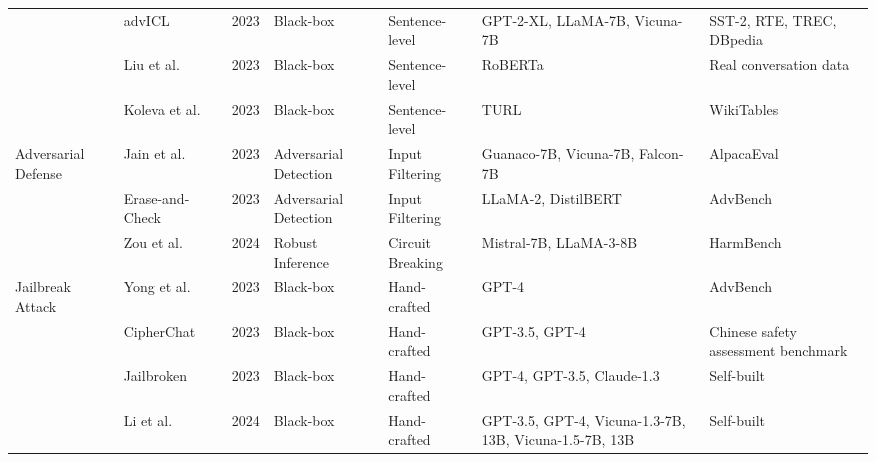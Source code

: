 \begin{table*}[htp]
{\begin{tabular}{p{}p{}p{}p{}p{}p{}p{}}
& \cellcolor{white}advICL~\cite{wang2023adversarial} & \cellcolor{white}2023 & \cellcolor{white}Black-box & \cellcolor{white}Sentence-level & \cellcolor{white}GPT-2-XL, LLaMA-7B, Vicuna-7B & \cellcolor{white}SST-2, RTE, TREC, DBpedia \\
& \cellcolor{gray!15!}Liu et al.~\cite{liu2023adversarial} & \cellcolor{gray!15!}2023 & \cellcolor{gray!15!}Black-box & \cellcolor{gray!15!}Sentence-level & \cellcolor{gray!15!}RoBERTa &  \cellcolor{gray!15!}Real conversation data \\
& \cellcolor{white}Koleva et al.~\cite{koleva2023adversarial} & \cellcolor{white}2023 & \cellcolor{white}Black-box & \cellcolor{white}Sentence-level & \cellcolor{white}TURL & \cellcolor{white}WikiTables \\
\hline
\multirow{3}{0.1\textwidth}{Adversarial Defense} & \cellcolor{gray!15!}Jain et al.\cite{jain2023baseline} & \cellcolor{gray!15!}2023 & \cellcolor{gray!15!}Adversarial Detection & \cellcolor{gray!15!}Input Filtering & \cellcolor{gray!15!}Guanaco-7B, Vicuna-7B, Falcon-7B & \cellcolor{gray!15!}AlpacaEval \\
& \cellcolor{white}Erase-and-Check~\cite{kumar2023certifying} & \cellcolor{white}2023 & \cellcolor{white}Adversarial Detection & \cellcolor{white}Input Filtering & \cellcolor{white}LLaMA-2, DistilBERT & \cellcolor{white}AdvBench \\
& \cellcolor{gray!15!}Zou et al.~\cite{zou2024improving} & \cellcolor{gray!15!}2024 & \cellcolor{gray!15!}Robust Inference & \cellcolor{gray!15!}Circuit Breaking & \cellcolor{gray!15!}Mistral-7B, LLaMA-3-8B & \cellcolor{gray!15!}HarmBench \\
\hline
\multirow{25}{0.1\textwidth}{Jailbreak Attack} & \cellcolor{white}Yong et al.~\cite{yong2023low} & \cellcolor{white}2023 & \cellcolor{white}Black-box & \cellcolor{white}Hand-crafted & \cellcolor{white}GPT-4 & \cellcolor{white}AdvBench \\
& \cellcolor{gray!15!}CipherChat~\cite{yuan2023gpt} & \cellcolor{gray!15!}2023 & \cellcolor{gray!15!}Black-box & \cellcolor{gray!15!}Hand-crafted & \cellcolor{gray!15!}GPT-3.5, GPT-4 & \cellcolor{gray!15!}Chinese safety assessment benchmark \\
& \cellcolor{white}Jailbroken~\cite{wei2024jailbroken} & \cellcolor{white}2023 & \cellcolor{white}Black-box & \cellcolor{white}Hand-crafted & \cellcolor{white}GPT-4, GPT-3.5, Claude-1.3 & \cellcolor{white}Self-built \\
& \cellcolor{gray!15!}Li et al.~\cite{li2024cross} & \cellcolor{gray!15!}2024 & \cellcolor{gray!15!}Black-box & \cellcolor{gray!15!}Hand-crafted & \cellcolor{gray!15!}GPT-3.5, GPT-4, Vicuna-1.3-7B, 13B, Vicuna-1.5-7B, 13B & \cellcolor{gray!15!}Self-built \\

\end{tabular}}
\end{table*}
